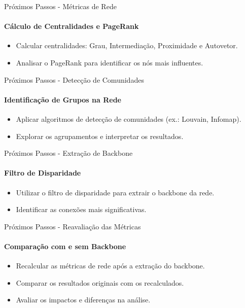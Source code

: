 \begin{frame}{Próximos Passos - Métricas de Rede}
    \framesubtitle{Cálculo de Centralidades e PageRank}
    \begin{block}{}
        \begin{itemize}
            \item Calcular centralidades: Grau, Intermediação, Proximidade e Autovetor.
            \item Analisar o PageRank para identificar os nós mais influentes.
        \end{itemize}
    \end{block}
\end{frame}

\begin{frame}{Próximos Passos - Detecção de Comunidades}
    \framesubtitle{Identificação de Grupos na Rede}
    \begin{block}{}
        \begin{itemize}
            \item Aplicar algoritmos de detecção de comunidades (ex.: Louvain, Infomap).
            \item Explorar os agrupamentos e interpretar os resultados.
        \end{itemize}
    \end{block}
\end{frame}

\begin{frame}{Próximos Passos - Extração de Backbone}
    \framesubtitle{Filtro de Disparidade}
    \begin{block}{}
        \begin{itemize}
            \item Utilizar o filtro de disparidade para extrair o backbone da rede.
            \item Identificar as conexões mais significativas.
        \end{itemize}
    \end{block}
\end{frame}

\begin{frame}{Próximos Passos - Reavaliação das Métricas}
    \framesubtitle{Comparação com e sem Backbone}
    \begin{block}{}
        \begin{itemize}
            \item Recalcular as métricas de rede após a extração do backbone.
            \item Comparar os resultados originais com os recalculados.
            \item Avaliar os impactos e diferenças na análise.
        \end{itemize}
    \end{block}
\end{frame}
